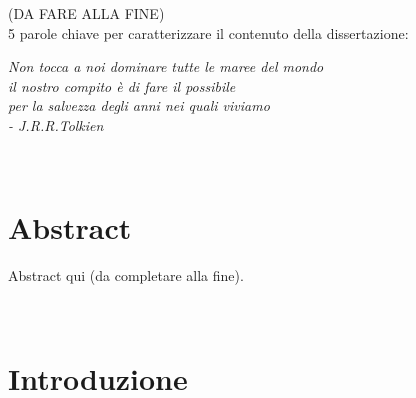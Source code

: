 \documentclass[12pt,a4paper,oneside]{book}
\begin{document}
\restoregeometry\newpage
\begin{center}
    (DA FARE ALLA FINE)\\
    5 parole chiave per caratterizzare il contenuto della dissertazione:
\end{center}

\newpage




\topmargin=6.5cm
\begin{flushright}
\emph{
\LARGE{Non tocca a noi dominare tutte le maree del mondo}\\
\LARGE{il nostro compito è di fare il possibile}\\
\LARGE{per la salvezza degli anni nei quali viviamo}\\
\vspace{5mm}
\LARGE{- J.R.R.Tolkien} \\
}
\end{flushright}




\newpage~\newpage
\chapter*{Abstract}
Abstract qui (da completare alla fine).




\topmargin=-1cm
\tableofcontents
\thispagestyle{empty}

\clearpage
\pagestyle{empty}
\begingroup
\let\clearpage\relax
\let\cleardoublepage\relax
\let\newpage\relax

\listoffigures
\vspace*{1cm}
\listoftables
\vspace*{1cm}
\lstlistoflistings\endgroup

\newpage~\newpage




\setcounter{page}{1}
\raggedbottom\pagestyle{plain}



\setcounter{chapter}{0}  \chapter{Introduzione}\label{chap:intro}
\end{document}
